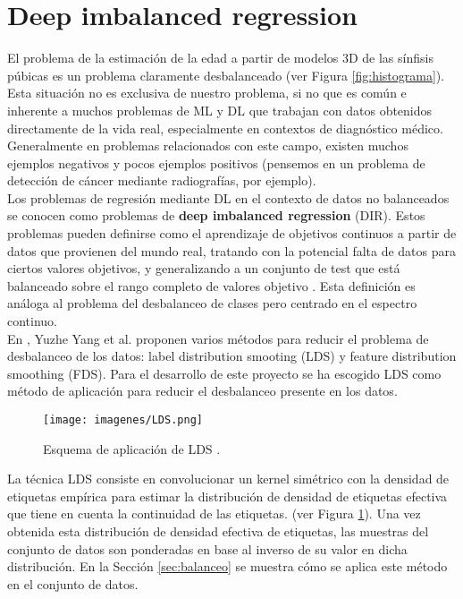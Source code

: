 \section{Deep imbalanced regression}
\label{sec:DIR}

El problema de la estimación de la edad a partir de modelos 3D de las sínfisis púbicas es un problema claramente desbalanceado (ver Figura \ref{fig:histograma}). Esta situación no es exclusiva de nuestro problema, si no que es común e inherente a muchos problemas de ML y DL que trabajan con datos obtenidos directamente de la vida real, especialmente en contextos de diagnóstico médico. Generalmente en problemas relacionados con este campo, existen muchos ejemplos negativos y pocos ejemplos positivos (pensemos en un problema de detección de cáncer mediante radiografías, por ejemplo).\\

Los problemas de regresión mediante DL en el contexto de datos no balanceados se conocen como problemas de \textbf{deep imbalanced regression} (DIR). Estos problemas pueden definirse como el aprendizaje de objetivos continuos a partir de datos que provienen del mundo real, tratando con la potencial falta de datos para ciertos valores objetivos, y generalizando a un conjunto de test que está balanceado sobre el rango completo de valores objetivo \cite{yang2021delving}. Esta definición es análoga al problema del desbalanceo de clases \cite{liu2019large} pero centrado en el espectro continuo.\\

En \cite{yang2021delving}, Yuzhe Yang et al. proponen varios métodos para reducir el problema de desbalanceo de los datos: label distribution smooting (LDS) y feature distribution smoothing (FDS). Para el desarrollo de este proyecto se ha escogido LDS como método de aplicación para reducir el desbalanceo presente en los datos.\\

\begin{figure}[ht!]
    \centering
    \texttt{[image: imagenes/LDS.png]}
    \caption[Esquema de aplicación de LDS.]{Esquema de aplicación de LDS \cite{yang2021delving}.}
    \label{fig:lds}
\end{figure}

\newpage

La técnica LDS consiste en convolucionar un kernel simétrico con la densidad de etiquetas empírica para estimar la distribución de densidad de etiquetas efectiva que tiene en cuenta la continuidad de las etiquetas. (ver Figura \ref{fig:lds}). Una vez obtenida esta distribución de densidad efectiva de etiquetas, las muestras del conjunto de datos son ponderadas en base al inverso de su valor en dicha distribución. En la Sección \ref{sec:balanceo} se muestra cómo se aplica este método en el conjunto de datos.



